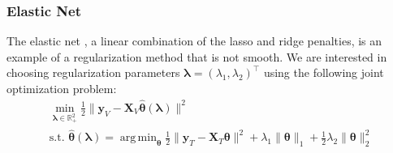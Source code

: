 \documentclass[12pt,letterpaper]{article}
\DeclareMathOperator*{\argmin}{arg\,min}
\begin{document}

\subsubsection{Elastic Net}\label{sec:enet}

The elastic net \citep{zou2003regression}, a linear combination of the lasso and ridge penalties, is an example of a regularization method that is not smooth. We are interested in choosing regularization parameters $\boldsymbol{\lambda} = (\lambda_1, \lambda_2)^\top$ using the following joint optimization problem:
\begin{equation}
\begin{array}{c}
\min_{\boldsymbol{\lambda} \in \mathbb{R}^2_{+}} \frac{1}{2} \| \boldsymbol{y}_V - \boldsymbol{X}_V \hat{\boldsymbol{\theta}} (\boldsymbol \lambda) \| ^2 \\
\text{s.t. }
\hat{\boldsymbol{\theta}} (\boldsymbol{\lambda}) = \argmin_{\boldsymbol{\theta}} \frac{1}{2} \| \boldsymbol{y}_T - \boldsymbol{X}_T \boldsymbol{\theta} \| ^2
+ \lambda_1 \| \boldsymbol{\theta} \|_1
+ \frac{1}{2}\lambda_2 \| \boldsymbol{\theta} \|_2^2
\end{array}
\end{equation}
\end{document}
